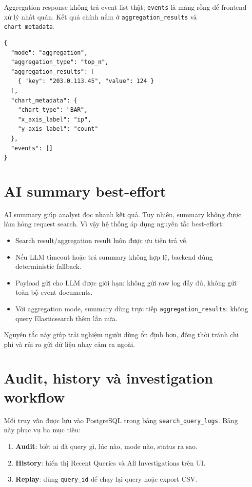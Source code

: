 \documentclass[12pt,a4paper]{report}
\begin{document}
Aggregation response không trả event list thật; \texttt{events} là mảng rỗng để frontend xử lý nhất quán. Kết quả chính nằm ở \texttt{aggregation\_results} và \texttt{chart\_metadata}.

\begin{lstlisting}[caption={Schema rút gọn của aggregation response}]
{
  "mode": "aggregation",
  "aggregation_type": "top_n",
  "aggregation_results": [
    { "key": "203.0.113.45", "value": 124 }
  ],
  "chart_metadata": {
    "chart_type": "BAR",
    "x_axis_label": "ip",
    "y_axis_label": "count"
  },
  "events": []
}
\end{lstlisting}

\section{AI summary best-effort}

AI summary giúp analyst đọc nhanh kết quả. Tuy nhiên, summary không được làm hỏng request search. Vì vậy hệ thống áp dụng nguyên tắc best-effort:

\begin{itemize}
    \item Search result/aggregation result luôn được ưu tiên trả về.
    \item Nếu LLM timeout hoặc trả summary không hợp lệ, backend dùng deterministic fallback.
    \item Payload gửi cho LLM được giới hạn: không gửi raw log đầy đủ, không gửi toàn bộ event documents.
    \item Với aggregation mode, summary dùng trực tiếp \texttt{aggregation\_results}; không query Elasticsearch thêm lần nữa.
\end{itemize}

Nguyên tắc này giúp trải nghiệm người dùng ổn định hơn, đồng thời tránh chi phí và rủi ro gửi dữ liệu nhạy cảm ra ngoài.

\section{Audit, history và investigation workflow}

Mỗi truy vấn được lưu vào PostgreSQL trong bảng \texttt{search\_query\_logs}. Bảng này phục vụ ba mục tiêu:

\begin{enumerate}
    \item \textbf{Audit}: biết ai đã query gì, lúc nào, mode nào, status ra sao.
    \item \textbf{History}: hiển thị Recent Queries và All Investigations trên UI.
    \item \textbf{Replay}: dùng \texttt{query\_id} để chạy lại query hoặc export CSV.
\end{enumerate}
\end{document}
